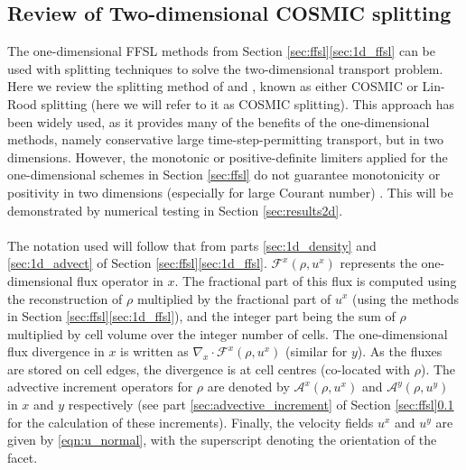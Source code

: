 \documentclass{ametsocV6.1}
\begin{document}
\subsection{Review of Two-dimensional COSMIC splitting} \label{sec:cosmic}

The one-dimensional FFSL methods from Section \ref{sec:ffsl}\ref{sec:1d_ffsl} can be used with splitting techniques to solve the two-dimensional transport problem. Here we review the splitting method of \citet{leonard1996cosmic} and \citet{lin1996ffsl}, known as either COSMIC or Lin-Rood splitting (here we will refer to it as COSMIC splitting). This approach has been widely used, as it provides many of the benefits of the one-dimensional methods, namely conservative large time-step-permitting transport, but in two dimensions. However, the monotonic or positive-definite limiters applied for the one-dimensional schemes in Section \ref{sec:ffsl} do not guarantee monotonicity or positivity in two dimensions (especially for large Courant number) \citep{lin1996ffsl,leonard1996cosmic}.
This will be demonstrated by numerical testing in Section \ref{sec:results2d}. \\ 
\\
The notation used will follow that from parts \ref{sec:1d_density} and \ref{sec:1d_advect} of Section \ref{sec:ffsl}\ref{sec:1d_ffsl}. $\mathcal{F}^x(\rho,u^x)$ represents the one-dimensional flux operator in $x$. 
The fractional part of this flux is computed using the reconstruction of $\rho$ multiplied by the fractional part of $u^x$ (using the methods in Section \ref{sec:ffsl}\ref{sec:1d_ffsl}), and the integer part being the sum of $\rho$ multiplied by cell volume over the integer number of cells. The one-dimensional flux divergence in $x$ is written as $\nabla_x\cdot \mathcal{F}^x(\rho,u^x)$ (similar for $y$).
As the fluxes are stored on cell edges, the divergence is at cell centres (co-located with $\rho$).
The advective increment operators for $\rho$ are denoted by $\mathcal{A}^x(\rho,u^x)$ and $\mathcal{A}^y(\rho,u^y)$ in $x$ and $y$ respectively  (see part \ref{sec:advective_increment} of Section \ref{sec:ffsl}\ref{sec:cosmic} for the calculation of these increments).
Finally, the velocity fields $u^x$ and $u^y$ are given by \eqref{eqn:u_normal}, with the superscript denoting the orientation of the facet.
\end{document}

